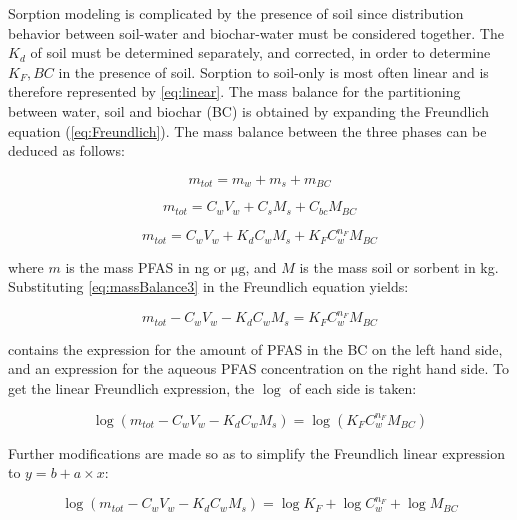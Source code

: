 Sorption modeling is complicated by the presence of soil since distribution behavior between soil-water and biochar-water must be considered together. The $K_d$ of soil must be determined separately, and corrected, in order to determine $K_F,BC$ in the presence of soil. Sorption to soil-only is most often linear and is therefore represented by \cref{eq:linear}. The mass balance for the partitioning between water, soil and biochar (BC) is obtained by expanding the Freundlich equation (\cref{eq:Freundlich}). The mass balance between the three phases can be deduced as follows:

\begin{equation} \label{eq:massBalance1}
    m_{tot} = m_{w} + m_{s} + m_{BC}
\end{equation}

\begin{equation} \label{eq:massBalance2}
     m_{tot} = C_{w}V_{w} + C_sM_s + C_{bc}M_{BC}
\end{equation}

\begin{equation} \label{eq:massBalance3}
     m_{tot} = C_{w}V_{w} + K_dC_{w}M_s + K_{F}C_{w}^{n_F}M_{BC}
\end{equation}
 
where $m$ is the mass PFAS in ng or $\mathrm{\mu g}$, and $M$ is the mass soil or sorbent in kg. Substituting \cref{eq:massBalance3} in the Freundlich equation yields:

\begin{equation} \label{eq:FreundFit}
    m_{tot} - C_{w}V_{w} - K_dC_{w}M_s = K_{F}C_{w}^{n_F}M_{BC}
\end{equation}

 contains the expression for the amount of PFAS in the BC on the left hand side, and an expression for the aqueous PFAS concentration on the right hand side. To get the linear Freundlich expression, the $\log$ of each side is taken:

\begin{equation} \label{eq:FreundLinSoil1}
   \log (m_{tot} - C_{w}V_{w} - K_dC_{w}M_s) = \log (K_{F}C_{w}^{n_F}M_{BC})
\end{equation}

Further modifications are made so as to simplify the Freundlich linear expression to $y = b + a \times x$:

\begin{equation} \label{eq:FreundLinSoil2}
    \log (m_{tot} - C_{w}V_{w} - K_dC_{w}M_s) = \log K_{F} + \log C_{w}^{n_F} + \log M_{BC}
\end{equation}

